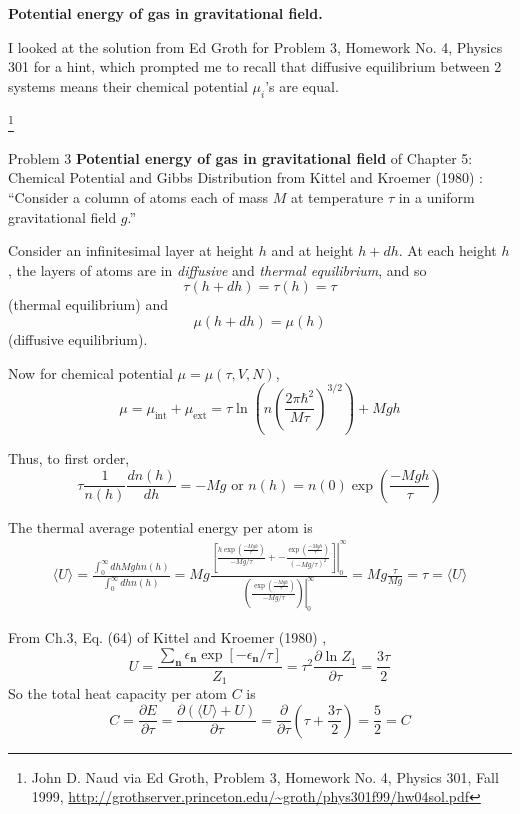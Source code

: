  \textbf{Potential energy of gas in gravitational field.}  

I looked at the solution from Ed Groth \cite{EGroth1999} for Problem 3, Homework No. 4, Physics 301 for a hint, which prompted me to recall that diffusive equilibrium between 2 systems means their chemical potential $\mu_i$'s are equal.  

\footnote{John D. Naud via Ed Groth, Problem 3, Homework No. 4, Physics 301, Fall 1999, \url{http://grothserver.princeton.edu/~groth/phys301f99/hw04sol.pdf} }

Problem 3 \textbf{Potential energy of gas in gravitational field} of Chapter 5: Chemical Potential and Gibbs Distribution from Kittel and Kroemer (1980) \cite{CKittelHKroemer1980}: ``Consider a column of atoms each of mass $M$ at temperature $\tau$ in a uniform gravitational field $g$.''

Consider an infinitesimal layer at height $h$ and at height $h+dh$.  At each height $h$, the layers of atoms are in \emph{diffusive} and \emph{thermal equilibrium}, and so
\[
\tau(h+dh) = \tau(h) = \tau
\]
(thermal equilibrium) and 
\[
\mu(h+dh) = \mu(h)
\]
(diffusive equilibrium).  

Now for chemical potential $\mu = \mu(\tau,V,N)$,
\[
\mu = \mu_{\text{int}} + \mu_{\text{ext}} = \tau \ln{ \left( n \left( \frac{ 2\pi \hbar^2 }{M\tau} \right)^{3/2} \right) } + Mgh
\]

Thus, to first order,
\[
\tau \frac{1}{n(h) } \frac{ dn(h) }{dh} = -Mg \text{ or } n(h) = n(0) \exp{ \left( \frac{-Mgh}{\tau} \right) }
\]

The thermal average potential energy per atom is 
\[
\begin{gathered}
  \langle U \rangle = \frac{ \int_0^{\infty} dh Mgh n(h) }{ \int_0^{\infty} dh n(h) } = Mg \frac{ \left. \left[ \frac{ h \exp{ \left( \frac{-Mgh}{\tau} \right) } }{ -Mg/\tau } + - \frac{ \exp{ \left( \frac{-Mgh}{\tau} \right) } }{ (-Mg/\tau)^2 } \right] \right|_0^{\infty} }{ \left. \left( \frac{ \exp{ \left( \frac{-Mgh}{\tau } \right) } }{ -Mg/\tau} \right) \right|_0^{\infty} } = Mg \frac{\tau}{Mg} = \boxed{ \tau = \langle U \rangle }
\end{gathered}
\]

From Ch.3, Eq. (64) of Kittel and Kroemer (1980) \cite{CKittelHKroemer1980}, 
\[
U = \frac{ \sum_{\mathbf{n}} \epsilon_{\mathbf{n}} \exp{ \left[ -\epsilon_{\mathbf{n}} /\tau \right] } }{Z_1} = \tau^2 \frac{ \partial \ln{Z_1}}{\partial \tau } = \frac{3\tau}{2}
\]
So the total heat capacity per atom $C$ is 
\[
C = \frac{ \partial E}{ \partial \tau} = \frac{ \partial ( \langle U \rangle + U ) }{ \partial \tau } = \frac{ \partial }{ \partial \tau} ( \tau + \frac{3\tau}{2} ) = \boxed{ \frac{5}{2}  = C}
\]


